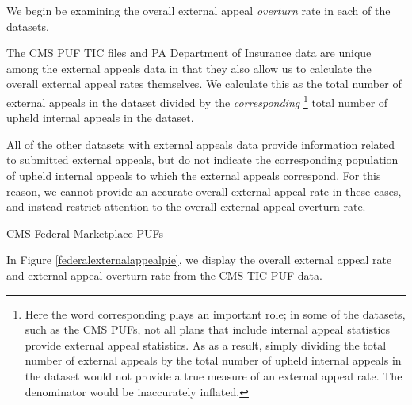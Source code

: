 \documentclass[12pt, a4paper,twoside]{report}
\theoremstyle{plain} %
\theoremstyle{definition} %
\theoremstyle{remark} %
\numberwithin{equation}{chapter}
\begin{document}
		We begin be examining the overall external appeal \emph{overturn} rate in each of the datasets.
		
		The CMS PUF TIC files and PA Department of Insurance data are unique among the external appeals data in that they also allow us to calculate the overall external appeal rates themselves. We calculate this as the total number of external appeals in the dataset divided by the \emph{corresponding} \footnote{Here the word corresponding plays an important role; in some of the datasets, such as the CMS PUFs, not all plans that include internal appeal statistics provide external appeal statistics. As as a result, simply dividing the total number of external appeals by the total number of upheld internal appeals in the dataset would not provide a true measure of an external appeal rate. The denominator would be inaccurately inflated.} total number of upheld internal appeals in the dataset.
		
		All of the other datasets with external appeals data provide information related to submitted external appeals, but do not indicate the corresponding population of upheld internal appeals to which the external appeals correspond. For this reason, we cannot provide an accurate overall external appeal rate in these cases, and instead restrict attention to the overall external appeal overturn rate.
		
		\underline{CMS Federal Marketplace PUFs}
		
		In Figure \ref{federalexternalappealpie}, we display the overall external appeal rate and external appeal overturn rate from the CMS TIC PUF data.
		
\end{document}
